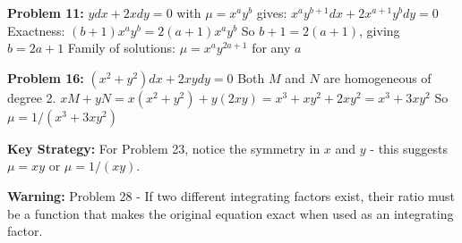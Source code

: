 \documentclass[12pt]{article}
\begin{document}
\textbf{Problem 11:}
$y dx + 2x dy = 0$ with $\mu = x^a y^b$ gives:
$x^a y^{b+1} dx + 2x^{a+1} y^b dy = 0$
Exactness: $(b+1)x^a y^b = 2(a+1)x^a y^b$
So $b + 1 = 2(a + 1)$, giving $b = 2a + 1$
Family of solutions: $\mu = x^a y^{2a+1}$ for any $a$

\textbf{Problem 16:}
$(x^2 + y^2)dx + 2xy dy = 0$
Both $M$ and $N$ are homogeneous of degree 2.
$xM + yN = x(x^2 + y^2) + y(2xy) = x^3 + xy^2 + 2xy^2 = x^3 + 3xy^2$
So $\mu = 1/(x^3 + 3xy^2)$

\textbf{Key Strategy:} For Problem 23, notice the symmetry in $x$ and $y$ - this suggests $\mu = xy$ or $\mu = 1/(xy)$.

\textbf{Warning:} Problem 28 - If two different integrating factors exist, their ratio must be a function that makes the original equation exact when used as an integrating factor.
\end{document}
